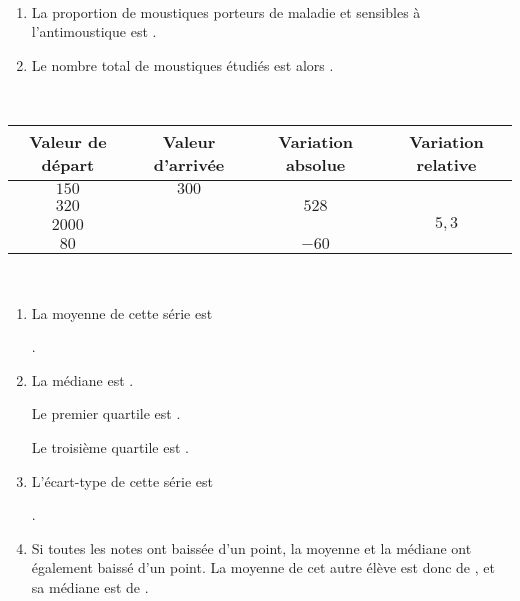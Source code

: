 \documentclass[
	classe=$2^{de}$,
	headerTitle=Évaluation\space Chapitre\space 4
]{évaluation}
\begin{document}
\maketitle

\begin{exercice}\

	\begin{enumerate}
		\item La proportion de moustiques porteurs de maladie et sensibles à l'antimoustique est .
		\item Le nombre total de moustiques étudiés est alors .
	\end{enumerate}
\end{exercice}

\begin{exercice}\

	\begin{center}
		\begin{tabular}{|c|c|c|c|}
			\hline
			Valeur de départ & Valeur d'arrivée     & Variation absolue    & Variation relative   \\ \hline
			$150$            & $300$                & \correction{$150$}   & \correction{1}       \\ \hline
			$320$            & \correction{$848$}   & $528$                & \correction{$1,65$}  \\ \hline
			$2000$           & \correction{$12600$} & \correction{$10600$} & $5,3$                \\ \hline
			$80$             & \correction{$20$}    & $-60$                & \correction{$-0,75$} \\ \hline
		\end{tabular}
	\end{center}
\end{exercice}

\begin{exercice}\

	\begin{enumerate}
		\item La moyenne de cette série est

		      .
		\item La médiane est .

		      Le premier quartile est .

		      Le troisième quartile est .
		\item L'écart-type de cette série est

		      .
		\item Si toutes les notes ont baissée d'un point, la moyenne et la médiane ont également baissé d'un point. La moyenne de cet autre élève est donc de , et sa médiane est de .
	\end{enumerate}
\end{exercice}
\end{document}
